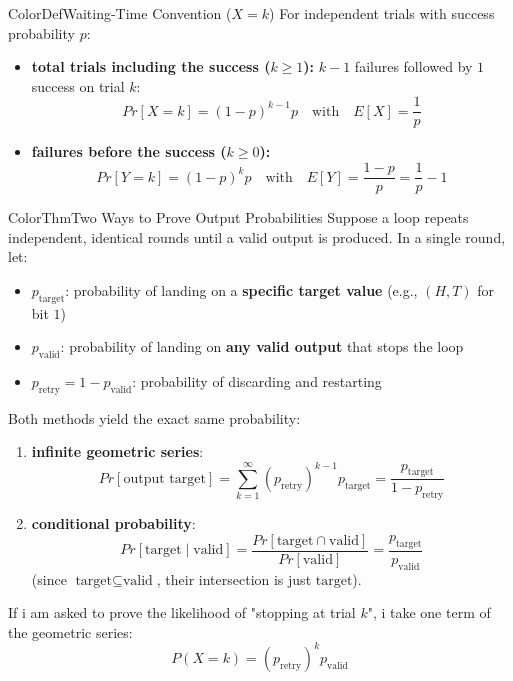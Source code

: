 \documentclass[a4paper, 11pt]{report}
\begin{document}
    \begin{cframe}{ColorDef}{Waiting-Time Convention ($X = k$)}{}
    For independent trials with success probability $p$:
    \begin{itemize}
        \item \textbf{total trials including the success ($k \ge 1$):} $k - 1$ failures followed by $1$ success on trial $k$:
            $$Pr[X = k] = (1-p)^{k-1} p \quad \text{with} \quad E[X] = \frac{1}{p}$$
        \item \textbf{failures before the success ($k \ge 0$):}
            $$Pr[Y = k] = (1-p)^k p \quad \text{with} \quad E[Y] = \frac{1-p}{p} = \frac{1}{p} - 1$$
    \end{itemize}
\end{cframe}

\begin{cframe}{ColorThm}{Two Ways to Prove Output Probabilities}
    Suppose a loop repeats independent, identical rounds until a valid output is produced. In a single round, let:
    \begin{itemize}
        \item $p_{\text{target}}$: probability of landing on a \textbf{specific target value} (e.g., $(H,T)$ for bit $1$)
        \item $p_{\text{valid}}$: probability of landing on \textbf{any valid output} that stops the loop
        \item $p_{\text{retry}} = 1 - p_{\text{valid}}$: probability of discarding and restarting
    \end{itemize}
    Both methods yield the exact same probability:
    \begin{enumerate}
        \item \textbf{infinite geometric series}:
            $$Pr[\text{output target}] = \sum_{k=1}^\infty (p_{\text{retry}})^{k-1} p_{\text{target}} = \frac{p_{\text{target}}}{1 - p_{\text{retry}}}$$
        \item \textbf{conditional probability}: 
            $$Pr[\text{target} \mid \text{valid}] = \frac{Pr[\text{target} \cap \text{valid}]}{Pr[\text{valid}]} = \frac{p_{\text{target}}}{p_{\text{valid}}}$$
            (since $\text{target} \subseteq \text{valid}$, their intersection is just $\text{target}$).
    \end{enumerate}

    If i am asked to prove the likelihood of "stopping at trial $k$", i take one term of the geometric series:
    $$ P(X = k) = (p_{\text{retry}})^{k} p_{\text{valid}} $$
\end{cframe}
\end{document}
